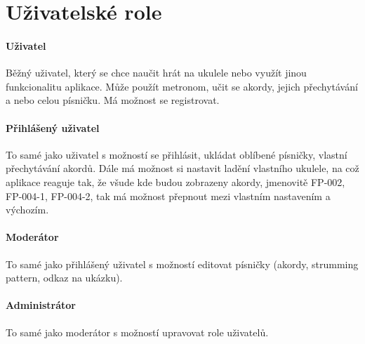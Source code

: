 \section{Uživatelské role}
\label{sc:user_roles}

\noindent \begin{minipage}{\textwidth}
    \paragraph{Uživatel}
    \begin{smallindent}{}
        Běžný uživatel, který se chce naučit hrát na ukulele nebo využít jinou funkcionalitu aplikace. Může použít metronom, učit se akordy, jejich přechytávání a nebo celou písničku.
        Má možnost se registrovat.
    \end{smallindent}
\end{minipage}


\noindent \begin{minipage}{\textwidth}
    \paragraph{Přihlášený uživatel}
    \begin{smallindent}{}
        To samé jako uživatel s možností se přihlásit, ukládat oblíbené písničky, vlastní přechytávání akordů. Dále má možnost si nastavit ladění vlastního ukulele, na což aplikace reaguje tak, že všude kde budou zobrazeny akordy, jmenovitě FP-002, FP-004-1, FP-004-2, tak má možnost přepnout mezi vlastním nastavením a výchozím.
    \end{smallindent}
\end{minipage}

\noindent \begin{minipage}{\textwidth}
    \paragraph{Moderátor}
    \begin{smallindent}{}
        To samé jako přihlášený uživatel s možností editovat písničky (akordy, strumming pattern, odkaz na ukázku).
    \end{smallindent}
\end{minipage}

\noindent \begin{minipage}{\textwidth}
    \paragraph{Administrátor}
    \begin{smallindent}{}
        To samé jako moderátor s možností upravovat role uživatelů.
    \end{smallindent}
\end{minipage}